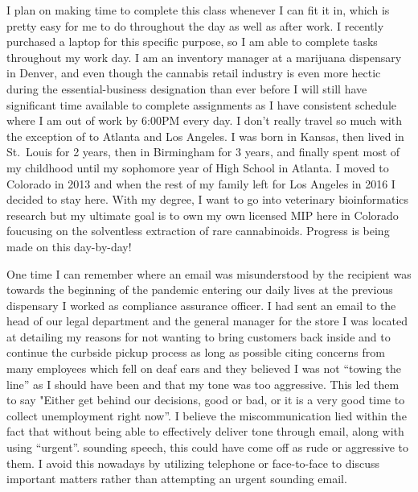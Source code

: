 \documentclass[stu,12pt]{apa7}
\begin{document}
        I plan on making time to complete this class whenever I can fit it in,
        which is pretty easy for me to do throughout the day as well as after
        work. I recently purchased a laptop for this specific purpose, so I am
        able to complete tasks throughout my work day. I am an inventory manager
        at a marijuana dispensary in Denver, and even though the cannabis
        retail industry is even more hectic during the essential-business
        designation than ever before I will still have significant time
        available to complete assignments as I have consistent schedule where I
        am out of work by 6:00PM every day. I don't really travel so much with
        the exception of to Atlanta and Los Angeles. I was born in Kansas, then
        lived in St.\ Louis for 2 years, then in Birmingham for 3 years, and
        finally spent most of my childhood until my sophomore year of High
        School in Atlanta. I moved to Colorado in 2013 and when the rest of my
        family left for Los Angeles in 2016 I decided to stay here. With my
        degree, I want to go into veterinary bioinformatics research but my
        ultimate goal is to own my own licensed MIP here in Colorado foucusing
        on the solventless extraction of rare cannabinoids. Progress is being
        made on this day-by-day!

      One time I can remember where an email was misunderstood by the recipient
        was towards the beginning of the pandemic entering our daily lives at
        the previous dispensary I worked as compliance assurance officer. I had
        sent an email to the head of our legal department and the general
        manager for the store I was located at detailing my reasons for not
        wanting to bring customers back inside and to continue the curbside
        pickup process as long as possible citing concerns from many employees
        which fell on deaf ears and they believed I was not ``towing the line''
        as I should have been and that my tone was too aggressive. This led them
        to say "Either get behind our decisions, good or bad, or it is a very
        good time to collect unemployment right now''. I believe the
        miscommunication lied within the fact that without being able to
        effectively deliver tone through email, along with using ``urgent''.
        sounding speech, this could have come off as rude or aggressive to them.
        I avoid this nowadays by utilizing telephone or face-to-face to discuss
        important matters rather than attempting an urgent sounding email.



\end{document}
